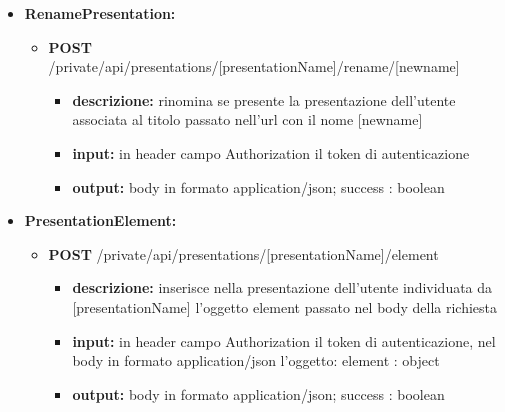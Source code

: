 {{\begin{itemize}
\begin{itemize}
			\item  \textbf{DELETE} /private/api/presentations/[presentationName]
				\begin{itemize} 
				\item \textbf{descrizione:} elimina se presente la presentazione dell'utente associata al titolo passato nell'url
				\item \textbf{input:} in header campo Authorization il token di autenticazione
				\item \textbf{output:} body in formato application/json; success : boolean
				\end{itemize}
			\end{itemize}

		\item \textbf{RenamePresentation:}
			\begin{itemize}
			\item  \textbf{POST} /private/api/presentations/[presentationName]/rename/[newname] 
				\begin{itemize} 
				\item \textbf{descrizione:} rinomina se presente la presentazione dell'utente associata al titolo passato nell'url con il nome [newname]
				\item \textbf{input:} in header campo Authorization il token di autenticazione
				\item \textbf{output:} body in formato application/json; success : boolean
				\end{itemize}
			\end{itemize}
			
		\item \textbf{PresentationElement:}
			\begin{itemize}
			\item   \textbf{POST} /private/api/presentations/[presentationName]/element
				\begin{itemize} 
				\item \textbf{descrizione:} inserisce nella presentazione dell'utente individuata da [presentationName] l'oggetto element passato nel body della richiesta
				\item \textbf{input:} in header campo Authorization il token di autenticazione, nel body in formato application/json l'oggetto: element : object
				\item \textbf{output:} body in formato application/json; success : boolean
				\end{itemize}
				

\end{itemize}
\end{itemize}}}
